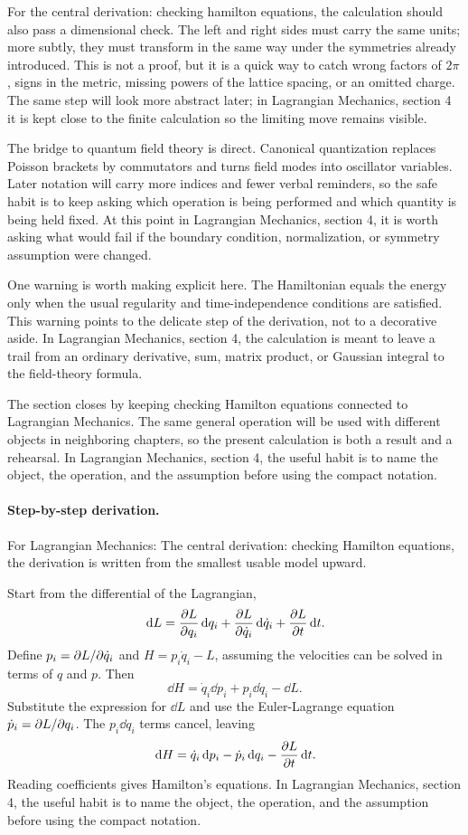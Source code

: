 For the central derivation: checking hamilton equations, the calculation should also pass a dimensional check.  The left and right sides must carry the same units; more subtly, they must transform in the same way under the symmetries already introduced.  This is not a proof, but it is a quick way to catch wrong factors of \(2\pi\), signs in the metric, missing powers of the lattice spacing, or an omitted charge.  The same step will look more abstract later; in Lagrangian Mechanics, section 4 it is kept close to the finite calculation so the limiting move remains visible.

The bridge to quantum field theory is direct.  Canonical quantization replaces Poisson brackets by commutators and turns field modes into oscillator variables.  Later notation will carry more indices and fewer verbal reminders, so the safe habit is to keep asking which operation is being performed and which quantity is being held fixed.  At this point in Lagrangian Mechanics, section 4, it is worth asking what would fail if the boundary condition, normalization, or symmetry assumption were changed.

One warning is worth making explicit here.  The Hamiltonian equals the energy only when the usual regularity and time-independence conditions are satisfied.  This warning points to the delicate step of the derivation, not to a decorative aside.  In Lagrangian Mechanics, section 4, the calculation is meant to leave a trail from an ordinary derivative, sum, matrix product, or Gaussian integral to the field-theory formula.

The section closes by keeping checking Hamilton equations connected to Lagrangian Mechanics.  The same general operation will be used with different objects in neighboring chapters, so the present calculation is both a result and a rehearsal.  In Lagrangian Mechanics, section 4, the useful habit is to name the object, the operation, and the assumption before using the compact notation.



\paragraph{Step-by-step derivation.}

For Lagrangian Mechanics: The central derivation: checking Hamilton equations, the derivation is written from the smallest usable model upward.

Start from the differential of the Lagrangian,
\[
  \,\mathrm d L=\frac{\partial L}{\partial q_i}\,\mathrm d q_i+\frac{\partial L}{\partial\dot q_i}\,\mathrm d\dot q_i+\frac{\partial L}{\partial t}\,\mathrm d t.
\]
Define \(p_i=\partial L/\partial\dot q_i\) and \(H=p_i\dot q_i-L\), assuming the velocities can be solved in terms of \(q\) and \(p\).  Then
\[
  \dd H=\dot q_i\dd p_i+p_i\dd\dot q_i-\dd L.
\]
Substitute the expression for \(\dd L\) and use the Euler-Lagrange equation \(\dot p_i=\partial L/\partial q_i\).  The \(p_i\dd\dot q_i\) terms cancel, leaving
\[
  \,\mathrm d H=\dot q_i\,\mathrm d p_i-\dot p_i\,\mathrm d q_i-\frac{\partial L}{\partial t}\,\mathrm d t.
\]
Reading coefficients gives Hamilton's equations.  In Lagrangian Mechanics, section 4, the useful habit is to name the object, the operation, and the assumption before using the compact notation.

